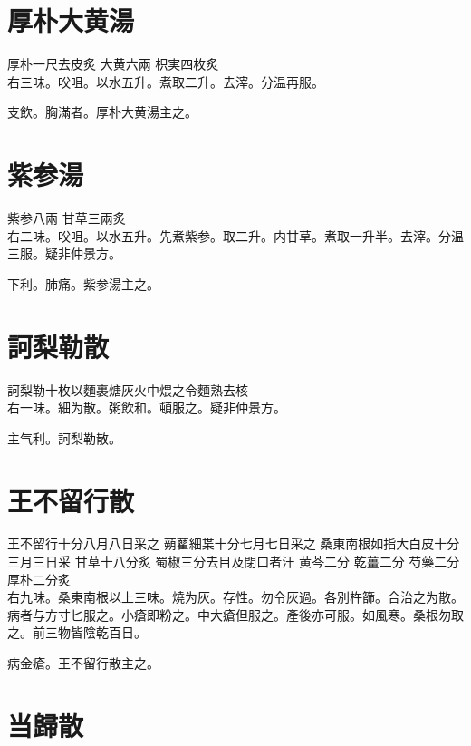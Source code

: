 \section{厚朴大黄湯}

厚朴{\scriptsize 一尺去皮炙} 大黄{\scriptsize 六兩} 枳実{\scriptsize 四枚炙}\\
右三味。㕮咀。以水五升。煮取二升。去滓。分温再服。

支飲。胸滿者。厚朴大黄湯主之。

\section{紫参湯}

紫参{\scriptsize 八兩} 甘草{\scriptsize 三兩炙}\\
右二味。㕮咀。以水五升。先煮紫参。取二升。内甘草。煮取一升半。去滓。分温三服。{\scriptsize 疑非仲景方。}

下利。肺痛。紫参湯主之。

\section{訶梨勒散}

訶梨勒{\scriptsize 十枚以麵裹煻灰火中煨之令麵熟去核}\\
右一味。細为散。粥飲和。頓服之。{\scriptsize 疑非仲景方。}

主气利。訶梨勒散。

\section{王不留行散}

王不留行{\scriptsize 十分八月八日采之} 蒴藋細枼{\scriptsize 十分七月七日采之} 桑東南根{\scriptsize 如指大白皮十分三月三日采} 甘草{\scriptsize 十八分炙} 蜀椒{\scriptsize 三分去目及閉口者汗} 黄芩{\scriptsize 二分} 乾薑{\scriptsize 二分} 芍藥{\scriptsize 二分} 厚朴{\scriptsize 二分炙}\\
右九味。桑東南根以上三味。燒为灰。存性。勿令灰過。各別杵篩。合治之为散。病者与方寸匕服之。小瘡即粉之。中大瘡但服之。產後亦可服。如風寒。桑根勿取之。前三物皆陰乾百日。

病金瘡。王不留行散主之。

\section{当歸散}

